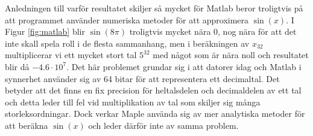 \documentclass[a4paper]{article}
\begin{document}
Anledningen till varför resultatet skiljer så mycket för Matlab beror troligtvis på att programmet använder numeriska metoder för att approximera $\sin(x)$. I Figur \ref{fig:matlab} blir $\sin(8\pi)$ troligtvis mycket nära $0$, nog nära för att det inte skall spela roll i de flesta sammanhang, men i beräkningen av $x_{32}$ multiplicerar vi ett mycket stort tal $5^{32}$ med något som är nära noll och resultatet blir då $-4.6\cdot10^7$. Det här problemet grundar sig i att datorer idag och Matlab i synnerhet använder sig av 64 bitar för att representera ett decimaltal. Det betyder att det finns en fix precision för heltalsdelen och decimaldelen av ett tal och detta leder till fel vid multiplikation av tal som skiljer sig många storleksordningar. Dock verkar Maple använda sig av mer analytiska metoder för att beräkna $\sin(x)$ och leder därför inte av samma problem.
\end{document}
